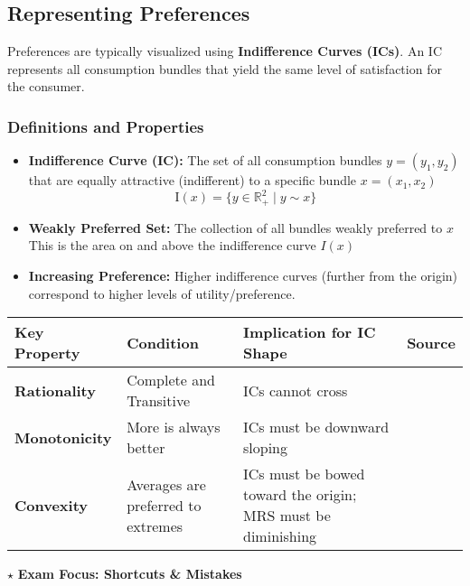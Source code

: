 \documentclass{article}
\begin{document}
\subsection{Representing Preferences}

Preferences are typically visualized using \textbf{Indifference Curves (ICs)}. An IC represents all consumption bundles that yield the same level of satisfaction for the consumer.

\subsubsection*{Definitions and Properties}

\begin{itemize}
    \item \textbf{Indifference Curve (IC):} The set of all consumption bundles $y = (y_1, y_2)$ that are equally attractive (indifferent) to a specific bundle $x = (x_1, x_2)$ \[\text{I}(x) = \{y \in \mathbb{R}^2_+ \mid y \sim x\}\]

    \item \textbf{Weakly Preferred Set:} The collection of all bundles weakly preferred to $x$ This is the area on and above the indifference curve $I(x)$

    \item \textbf{Increasing Preference:} Higher indifference curves (further from the origin) correspond to higher levels of utility/preference.
\end{itemize}

\begin{center}
    \begin{tabular}{llll}
        \toprule
        Key Property & Condition & Implication for IC Shape & Source \\
        \midrule
        \textbf{Rationality} & Complete and Transitive & ICs cannot cross & \\
        \textbf{Monotonicity} & More is always better & ICs must be downward sloping & \\
        \textbf{Convexity} & Averages are preferred to extremes & ICs must be bowed toward the origin; MRS must be diminishing & \\
        \bottomrule
    
\end{tabular}

\end{center}

$\star$ \textbf{Exam Focus: Shortcuts \& Mistakes}
\end{document}
